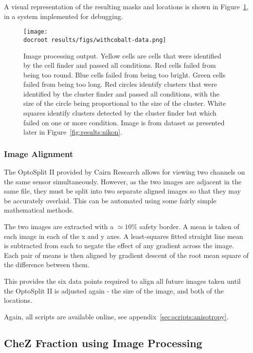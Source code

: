 \documentclass[../main.tex]{subfiles}
\begin{document}
A visual representation of the resulting masks and locations is shown in Figure~\ref{fig:imageprocessing:output}, in a system implemented for debugging.

\begin{figure}
\begin{center}
\texttt{[image: \\docroot results/figs/withcobalt-data.png]}
\caption[Image Processing Output]{Image processing output. Yellow cells are cells that were identified by the cell finder and passed all conditions. Red cells failed from being too round. Blue cells failed from being too bright. Green cells failed from being too long. Red circles identify clusters that were identified by the cluster finder and passed all conditions, with the size of the circle being proportional to the size of the cluster. White squares identify clusters detected by the cluster finder but which failed on one or more condition. Image is from dataset as presented later in Figure~\ref{fig:results:nikon}.}
\label{fig:imageprocessing:output}
\end{center}
\end{figure}

\subsubsection{Image Alignment}

The OptoSplit II provided by Cairn Research allows for viewing two channels on the same sensor simultaneously. However, as the two images are adjacent in the same file, they must be split into two separate aligned images so that they may be accurately overlaid. This can be automated using some fairly simple mathematical methods.

The two images are extracted with a \(\simeq10\%\) safety border. A mean is taken of each image in each of the x and y axes. A least-squares fitted straight line mean is subtracted from each to negate the effect of any gradient across the image. Each pair of means is then aligned by gradient descent of the root mean square of the difference between them.

This provides the six data points required to align all future images taken until the OptoSplit II is adjusted again - the size of the image, and both of the locations.

Again, all scripts are available online, see appendix~\ref{sec:scripts:anisotropy}.

\newpage
\subsection{CheZ Fraction using Image Processing}
\end{document}
